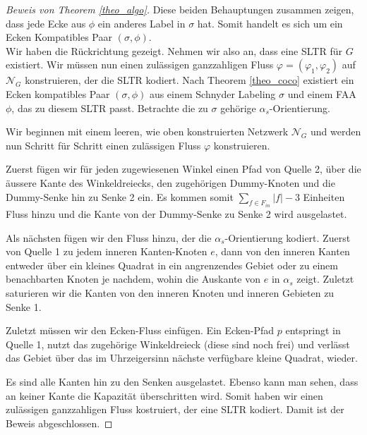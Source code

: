 \begin{proof}[Beweis von Theorem \ref{theo_algo}]
Diese beiden Behauptungen zusammen zeigen, dass jede Ecke aus $\phi$ ein anderes Label in $\sigma$ hat. Somit handelt es sich um ein Ecken Kompatibles Paar $(\sigma,\phi)$.\\

Wir haben die Rückrichtung gezeigt. Nehmen wir also an, dass eine SLTR für $G$ existiert. Wir müssen nun einen zulässigen ganzzahligen Fluss $\varphi=(\varphi_1,\varphi_2)$ auf $\mathcal{N}_G$ konstruieren, der die SLTR kodiert. Nach Theorem \ref{theo_coco} existiert ein Ecken kompatibles Paar $(\sigma,\phi)$ aus einem Schnyder Labeling $\sigma$ und einem FAA $\phi$, das zu diesem SLTR passt. Betrachte die zu $\sigma$ gehörige $\alpha_s$-Orientierung.

Wir beginnen mit einem leeren, wie oben konstruierten Netzwerk $\mathcal{N}_G$ und werden nun Schritt für Schritt einen zulässigen Fluss $\varphi$ konstruieren.

Zuerst fügen wir für jeden zugewiesenen Winkel einen Pfad von Quelle 2, über die äussere Kante des Winkeldreiecks, den zugehörigen Dummy-Knoten und die Dummy-Senke hin zu Senke 2 ein. Es kommen somit $\sum_{f \in F_{in}}|f|-3$ Einheiten Fluss hinzu und die Kante von der Dummy-Senke zu Senke 2 wird ausgelastet.

Als nächsten fügen wir den Fluss hinzu, der die $\alpha_s$-Orientierung kodiert. Zuerst von Quelle 1 zu jedem inneren Kanten-Knoten $e$, dann von den inneren Kanten entweder über ein kleines Quadrat in ein angrenzendes Gebiet oder zu einem benachbarten Knoten je nachdem, wohin die Auskante von $e$ in $\alpha_s$ zeigt. Zuletzt saturieren wir die Kanten von den inneren Knoten und inneren Gebieten zu Senke 1.

Zuletzt müssen wir den Ecken-Fluss einfügen. Ein Ecken-Pfad $p$ entspringt in Quelle 1, nutzt das zugehörige Winkeldreieck (diese sind noch frei) und verlässt das Gebiet über das im Uhrzeigersinn nächste verfügbare kleine Quadrat, wieder. 

Es sind alle Kanten hin zu den Senken ausgelastet. Ebenso kann man sehen, dass an keiner Kante die Kapazität überschritten wird. Somit haben wir einen zulässigen ganzzahligen Fluss kostruiert, der eine SLTR kodiert. Damit ist der Beweis abgeschlossen.

\end{proof}


